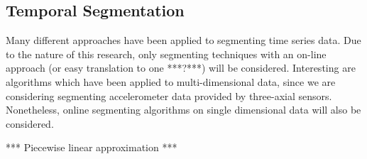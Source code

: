 
\subsection{Temporal Segmentation}\label{sec:lit_review_temporal_segmentation}
Many different approaches have been applied to segmenting time series data.
Due to the nature of this research, only segmenting techniques with an on-line approach (or easy translation to one ***?***) will be considered.
Interesting are algorithms which have been applied to multi-dimensional data, since we are considering segmenting accelerometer data provided by three-axial sensors.
Nonetheless, online segmenting algorithms on single dimensional data will also be considered.


*** Piecewise linear approximation ***


